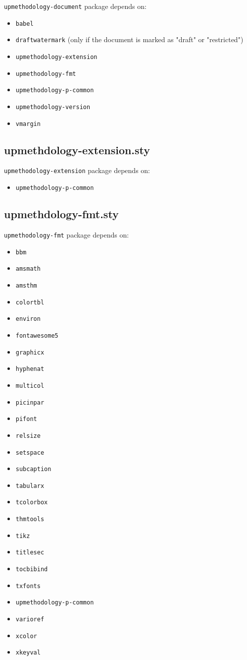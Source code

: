 \documentclass[book,taskpackage,specpackage,codepackage]{upmethodology-document}
\begin{document}
\texttt{upmethodology-document} package depends on:
\begin{itemize}
\item \texttt{babel}
\item \texttt{draftwatermark} (only if the document is marked as "draft" or "restricted")
\item \texttt{upmethodology-extension}
\item \texttt{upmethodology-fmt}
\item \texttt{upmethodology-p-common}
\item \texttt{upmethodology-version}
\item \texttt{vmargin}
\end{itemize}

\subsection{upmethdology-extension.sty}

\texttt{upmethodology-extension} package depends on:
\begin{itemize}
\item \texttt{upmethodology-p-common}
\end{itemize}

\subsection{upmethdology-fmt.sty}

\texttt{upmethodology-fmt} package depends on:
\begin{itemize}
\item \texttt{bbm}
\item \texttt{amsmath}
\item \texttt{amsthm}
\item \texttt{colortbl}
\item \texttt{environ}
\item \texttt{fontawesome5}
\item \texttt{graphicx}
\item \texttt{hyphenat}
\item \texttt{multicol}
\item \texttt{picinpar}
\item \texttt{pifont}
\item \texttt{relsize}
\item \texttt{setspace}
\item \texttt{subcaption}
\item \texttt{tabularx}
\item \texttt{tcolorbox}
\item \texttt{thmtools}
\item \texttt{tikz}
\item \texttt{titlesec}
\item \texttt{tocbibind}
\item \texttt{txfonts}
\item \texttt{upmethodology-p-common}
\item \texttt{varioref}
\item \texttt{xcolor}
\item \texttt{xkeyval}
\end{itemize}
\end{document}
